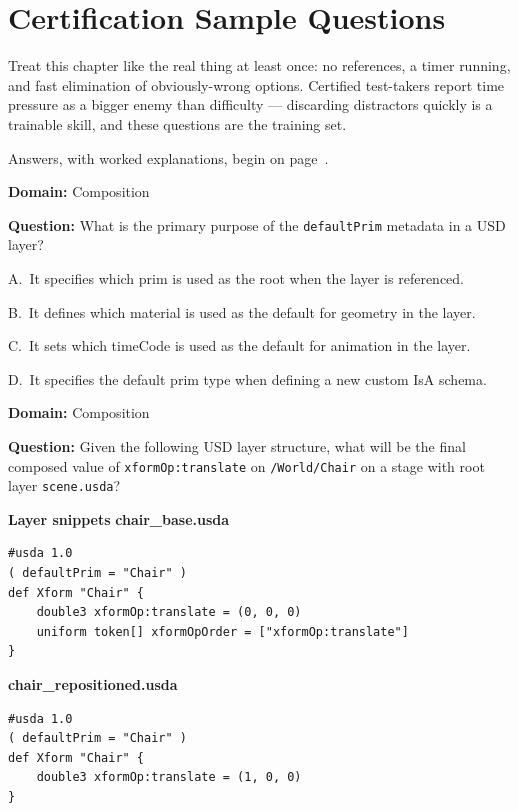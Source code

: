 \chapter{Certification Sample Questions}

\begin{FieldNote}
Treat this chapter like the real thing at least once: no references, a
timer running, and fast elimination of obviously-wrong options. Certified
test-takers report time pressure as a bigger enemy than difficulty ---
discarding distractors quickly is a trainable skill, and these questions
are the training set.
\end{FieldNote}

\noindent Answers, with worked explanations, begin on
page~\pageref{sec:sample-key}.

\noindent\textbf{Domain:} Composition\par
\vspace{0.4em}
\noindent\textbf{Question:} What is the primary purpose of the \texttt{defaultPrim} metadata in a USD layer?
\begin{Choices}
  \item A.\ It specifies which prim is used as the root when the layer is referenced.
  \item B.\ It defines which material is used as the default for geometry in the layer.
  \item C.\ It sets which timeCode is used as the default for animation in the layer.
  \item D.\ It specifies the default prim type when defining a new custom IsA schema.
\end{Choices}

\noindent\textbf{Domain:} Composition\par
\vspace{0.4em}
\noindent\textbf{Question:} Given the following USD layer structure, what will be the final composed value of \texttt{xformOp:translate} on \texttt{/World/Chair} on a stage with root layer \texttt{scene.usda}?
\par\vspace{0.4em}\noindent\textbf{Layer snippets}
\noindent\textbf{chair\_base.usda}
\begin{lstlisting}
#usda 1.0
( defaultPrim = "Chair" )
def Xform "Chair" {
    double3 xformOp:translate = (0, 0, 0)
    uniform token[] xformOpOrder = ["xformOp:translate"]
}
\end{lstlisting}

\noindent\textbf{chair\_repositioned.usda}
\begin{lstlisting}
#usda 1.0
( defaultPrim = "Chair" )
def Xform "Chair" {
    double3 xformOp:translate = (1, 0, 0)
}
\end{lstlisting}

